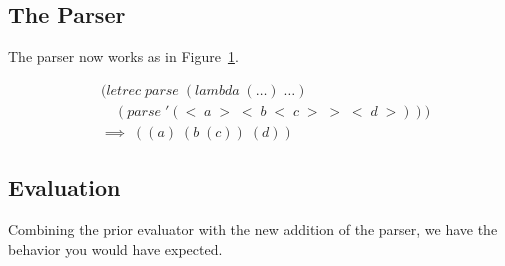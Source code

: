 \subsection{The Parser}
The parser now works as in Figure~\ref{fig:parserExample}. 

\begin{figure}[htp]
\footnotesize
\caption{}\label{fig:parserExample}
\begin{align*}
& (letrec \; parse \; (lambda \; (\dots) \; \dots)
\\& \quad (parse \; '(< \; a \; > \; < \; b \; < \; c \; > \; > \; < \; d \; >)))
\\& \implies \; ((a) \; (b \; (c)) \; (d))
\end{align*}
\end{figure}

\subsection{Evaluation}
Combining the prior evaluator with the new addition of the parser, we have the behavior you would have expected.
